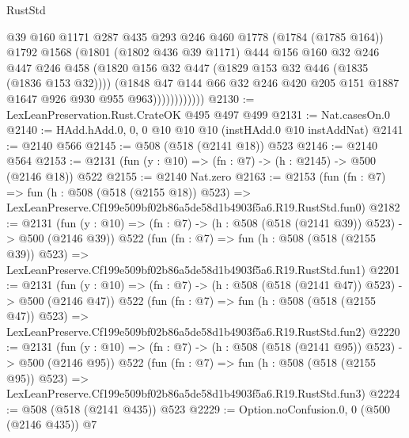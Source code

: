 \begin{lexlean}{RustStd}
\begin{coremodule}
                        @39
                        @160
                        @1171
                        @287
                        @435
                        @293
                        @246
                        @460
                        @1778
                        (@1784 (@1785 @164))
                        @1792
                        @1568
                        (@1801
                          (@1802 @436 @39 @1171)
                          @444
                          @156
                          @160
                          @32
                          @246
                          @447
                          @246
                          @458
                          (@1820 @156 @32 @447 (@1829 @153 @32 @446 (@1835 (@1836 @153 @32))))
                          (@1848
                            @47
                            @144
                            @66
                            @32
                            @246
                            @420
                            @205
                            @151
                            @1887
                            @1647
                            @926
                            @930
                            @955
                            @963))))))))))))
@2130 := LexLeanPreservation.Rust.CrateOK @495 @497 @499
@2131 := Nat.casesOn.{0}
@2140 := HAdd.hAdd.{0, 0, 0} @10 @10 @10 (instHAdd.{0} @10 instAddNat)
@2141 := @2140 @566
@2145 := @508 (@518 (@2141 @18)) @523
@2146 := @2140 @564
@2153 := @2131 (fun (y : @10) => (fn : @7) -> (h : @2145) -> @500 (@2146 @18)) @522
@2155 := @2140 Nat.zero
@2163 := @2153
    (fun (fn : @7) =>
    fun (h : @508 (@518 (@2155 @18)) @523) =>
    LexLeanPreserve.Cf199e509bf02b86a5de58d1b4903f5a6.R19.RustStd.fun0)
@2182 := @2131
    (fun (y : @10) => (fn : @7) -> (h : @508 (@518 (@2141 @39)) @523) -> @500 (@2146 @39))
    @522
    (fun (fn : @7) =>
    fun (h : @508 (@518 (@2155 @39)) @523) =>
    LexLeanPreserve.Cf199e509bf02b86a5de58d1b4903f5a6.R19.RustStd.fun1)
@2201 := @2131
    (fun (y : @10) => (fn : @7) -> (h : @508 (@518 (@2141 @47)) @523) -> @500 (@2146 @47))
    @522
    (fun (fn : @7) =>
    fun (h : @508 (@518 (@2155 @47)) @523) =>
    LexLeanPreserve.Cf199e509bf02b86a5de58d1b4903f5a6.R19.RustStd.fun2)
@2220 := @2131
    (fun (y : @10) => (fn : @7) -> (h : @508 (@518 (@2141 @95)) @523) -> @500 (@2146 @95))
    @522
    (fun (fn : @7) =>
    fun (h : @508 (@518 (@2155 @95)) @523) =>
    LexLeanPreserve.Cf199e509bf02b86a5de58d1b4903f5a6.R19.RustStd.fun3)
@2224 := @508 (@518 (@2141 @435)) @523
@2229 := Option.noConfusion.{0, 0} (@500 (@2146 @435)) @7

\end{coremodule}
\end{lexlean}
